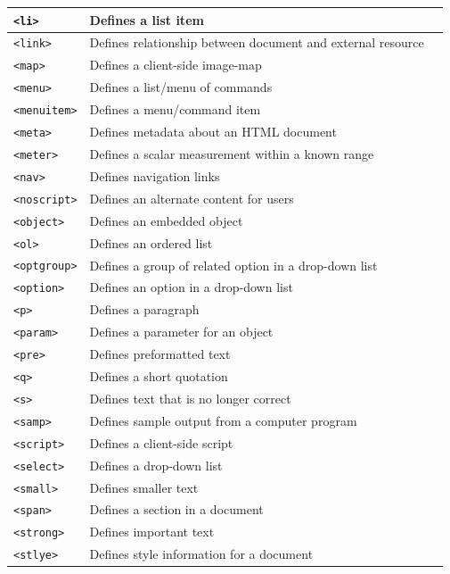 \documentclass[11pt, letterpaper]{article}
\begin{document}
\begin{longtable}{l p{10cm} l}
			\texttt{<li>} & Defines a list item\\\midrule
			\texttt{<link>} & Defines relationship between document and external resource\\\midrule
			\texttt{<map>} & Defines a client-side image-map\\\midrule
			\texttt{<menu>} & Defines a list/menu of commands\\\midrule
			\texttt{<menuitem>} & Defines a menu/command item\\\midrule
			\texttt{<meta>} & Defines metadata about an HTML document\\\midrule
			\texttt{<meter>} & Defines a scalar measurement within a known range\\\midrule
			\texttt{<nav>} & Defines navigation links\\\midrule
			\texttt{<noscript>} & Defines an alternate content for users\\\midrule
			\texttt{<object>} & Defines an embedded object\\\midrule
			\texttt{<ol>} & Defines an ordered list\\\midrule
			\texttt{<optgroup>} & Defines a group of related option in a drop-down list\\\midrule
			\texttt{<option>} & Defines an option in a drop-down list\\\midrule
			\texttt{<p>} & Defines a paragraph\\\midrule
			\texttt{<param>} & Defines a parameter for an object\\\midrule
			\texttt{<pre>} & Defines preformatted text\\\midrule
			\texttt{<q>} & Defines a short quotation\\\midrule
			\texttt{<s>} & Defines text that is no longer correct\\\midrule
			\texttt{<samp>} & Defines sample output from a computer program\\\midrule
			\texttt{<script>} & Defines a client-side script\\\midrule
			\texttt{<select>} & Defines a drop-down list\\\midrule
			\texttt{<small>} & Defines smaller text\\\midrule
			\texttt{<span>} & Defines a section in a document\\\midrule
			\texttt{<strong>} & Defines important text\\\midrule
			\texttt{<stlye>} & Defines style information for a document\\\midrule

\end{longtable}
\end{document}
